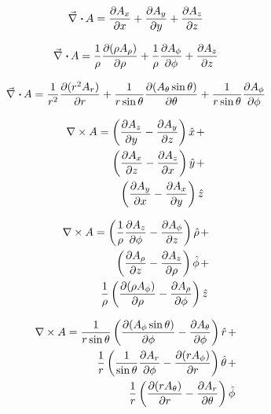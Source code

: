 \documentclass[a4paper,10pt]{article}
\begin{document}
\begin{multicols}{2}
  \begin{equation*}
    \div A = \dep{A_x}{x} + \dep{A_y}{y} + \dep{A_z}{z}
  \end{equation*}
  
  \begin{equation*}
    \div A = \frac{1}{\rho} \dep{(\rho A_\rho)}{\rho} +
    \frac{1}{\rho} \dep{A_\phi}{\phi} +
    \dep{A_z}{z}
  \end{equation*}
  
  \begin{equation*}
    \div A = \frac{1}{r^2} \dep{(r^2 A_r)}{r} +
    \frac{1}{r \sin \theta} \dep{(A_\theta \sin\theta)}{\theta} +
    \frac{1}{r \sin\theta} \dep{A_\phi}{\phi}
  \end{equation*}

\begin{align*}
  \rot A = \lrb{\dep{A_z}{y} - \dep{A_y}{z}} \hat{x} + \\
  \lrb{\dep{A_x}{z} - \dep{A_z}{x}} \hat{y} + \\
  \lrb{\dep{A_y}{x} - \dep{A_x}{y}} \hat{z}
\end{align*}

\begin{align*}
  \rot A = \lrb{\frac{1}{\rho} \dep{A_z}{\phi} - \dep{A_\phi}{z}} \hat{\rho} + \\
  \lrb{\dep{A_\rho}{z} - \dep{A_z}{\rho}} \hat{\phi} + \\
  \frac{1}{\rho} \lrb{\dep{(\rho A_\phi)}{\rho} - \dep{A_\rho}{\phi}} \hat{z}
\end{align*}

\begin{align*}
  \rot A = \frac{1}{r \sin\theta} \lrb{\dep{(A_\phi \sin\theta)}{\phi} - \dep{A_\theta}{\phi}} \hat{r} + \\
  \frac{1}{r} \lrb{\frac{1}{\sin\theta} \dep{A_r}{\phi} - \dep{(r A_\phi)}{r}} \hat{\theta} + \\
  \frac{1}{r} \lrb{\dep{(r A_\theta)}{r} - \dep{A_r}{\theta}} \hat{\phi}
\end{align*}
\end{multicols}
\end{document}
